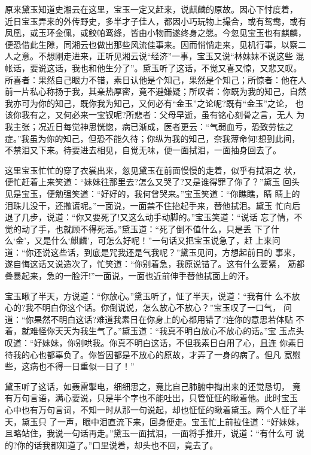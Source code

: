原来黛玉知道史湘云在这里，宝玉一定又赶来，说麒麟的原故。因心下忖度着，
近日宝玉弄来的外传野史，多半才子佳人，都因小巧玩物上撮合，或有鸳鸯，或有
凤凰，或玉环金佩，或鲛帕鸾绦，皆由小物而遂终身之愿。今忽见宝玉也有麒麟，
便恐借此生隙，同湘云也做出那些风流佳事来。因而悄悄走来，见机行事，以察二
人之意。不想刚走进来，正听见湘云说“经济”一事，宝玉又说“林妹妹不说这些
混帐话，要说这话，我也和他生分了”。黛玉听了这话，不觉又喜又惊，又悲又叹。
所喜者：果然自己眼力不错，素日认他是个知己，果然是个知己；所惊者：他在人
前一片私心称扬于我，其亲热厚密，竟不避嫌疑；所叹者：你既为我的知己，自然
我亦可为你的知己，既你我为知己，又何必有“金玉”之论呢?既有“金玉”之论，
也该你我有之，又何必来一宝钗呢?所悲者：父母早逝，虽有铭心刻骨之言，无人
为我主张；况近日每觉神思恍惚，病已渐成，医者更云：“气弱血亏，恐致劳怯之
症。”我虽为你的知己，但恐不能久待；你纵为我的知己，奈我薄命何!想到此间，
不禁泪又下来。待要进去相见，自觉无味，便一面拭泪，一面抽身回去了。

这里宝玉忙忙的穿了衣裳出来，忽见黛玉在前面慢慢的走着，似乎有拭泪之
状，便忙赶着上来笑道：“妹妹往那里去?怎么又哭了?又是谁得罪了你了？”黛玉
回头见是宝玉，便勉强笑道：“好好的，我何曾哭来。”宝玉笑道：“你瞧瞧，睛
睛上的泪珠儿没干，还撒谎呢。”一面说，一面禁不住抬起手来，替他拭泪。黛玉
忙向后退了几步，说道：“你又要死了!又这么动手动脚的。”宝玉笑道：“说话
忘了情，不觉的动了手，也就顾不得死活。”黛玉道：“死了倒不值什么，只是丢
下了什么‘金’，又是什么‘麒麟’，可怎么好呢！”一句话又把宝玉说急了，赶
上来问道：“你还说这些话，到底是咒我还是气我呢？”黛玉见问，方想起前日的
事来，遂自悔这话又说造次了，忙笑道：“你别着急，我原说错了。这有什么要紧，
筋都叠暴起来，急的一脸汗!”一面说，一面也近前伸手替他拭面上的汗。

宝玉瞅了半天，方说道：“你放心。”黛玉听了，怔了半天，说道：“我有什
么不放心的?我不明白你这个话。你倒说说，怎么放心不放心？”宝玉叹了一口气，
问道：“你果然不明白这话?难道我素日在你身上的心都用错了?连你的意思若体贴
不着，就难怪你天天为我生气了。”黛玉道：“我真不明白放心不放心的话。”宝
玉点头叹道：“好妹妹，你别哄我。你真不明白这话，不但我素日白用了心，且连
你素日待我的心也都辜负了。你皆因都是不放心的原故，才弄了一身的病了。但凡
宽慰些，这病也不得一日重似一日了！”

黛玉听了这话，如轰雷掣电，细细思之，竟比自己肺腑中掏出来的还觉恳切，
竟有万句言语，满心要说，只是半个字也不能吐出，只管怔怔的瞅着他。此时宝玉
心中也有万句言词，不知一时从那一句说起，却也怔怔的瞅着黛玉。两个人怔了半
天，黛玉只了一声，眼中泪直流下来，回身便走。宝玉忙上前拉住道：“好妹妹，
且略站住，我说一句话再走。”黛玉一面拭泪，一面将手推开，说道：“有什么可
说的?你的话我都知道了。”口里说着，却头也不回，竟去了。

